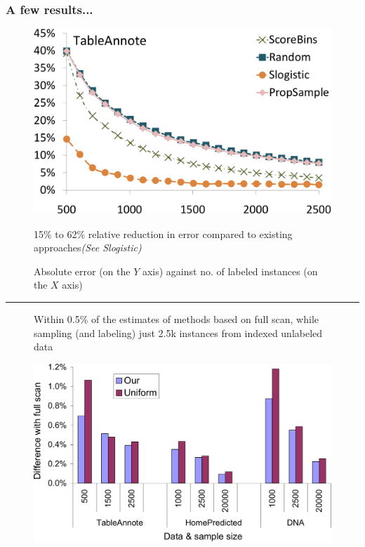 \documentclass[11pt]{beamer}
\begin{document}
\begin{frame}
\frametitle{A few results...}


\begin{center}
\begin{figure}
\begin{minipage}[b]{0.45\linewidth}
\begin{center}
\includegraphics[width=.8\hsize]{figs/e1tableannote_crop}
\caption{\tiny{Absolute error (on the $Y$ axis) against no. of labeled instances (on the $X$ axis)}}
\end{center}
\end{minipage}
\hspace{2mm}
\begin{minipage}[b]{0.45\linewidth}
15\% to 62\% relative reduction in error compared to existing \linebreak approaches\textit{(See Slogistic)} \\ \vspace{1cm}
\end{minipage}
\end{figure}
\hrule
\begin{figure}
\begin{minipage}[b]{0.45\linewidth}
Within 0.5\% of the estimates of methods based on full scan, while sampling (and labeling) just 2.5k instances from indexed unlabeled data \\
\end{minipage}
\hspace{2mm}
\begin{minipage}[b]{0.45\linewidth}
\begin{center}
\includegraphics[width=.9\hsize]{figs/allDataWts-crop}

\end{center}
\end{minipage}
\end{figure}
\end{center}
\end{frame}
\end{document}
